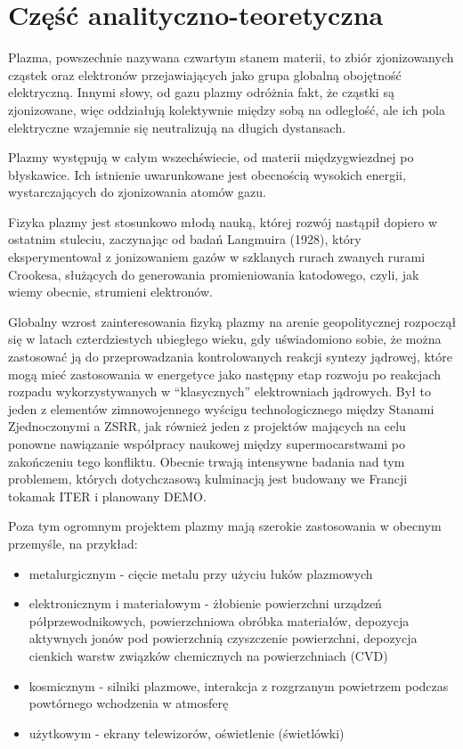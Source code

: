 \section[Część analityczno-teoretyczna]{Część analityczno-teoretyczna} %
    Plazma, powszechnie nazywana czwartym stanem materii, to zbiór
    zjonizowanych cząstek oraz elektronów przejawiających jako grupa globalną
    obojętność elektryczną. Innymi słowy, od gazu plazmy odróżnia fakt, że
    cząstki są zjonizowane, więc oddziałują kolektywnie między sobą na
    odległość, ale ich pola elektryczne wzajemnie się neutralizują na długich
    dystansach.

    Plazmy występują w całym wszechświecie, od materii międzygwiezdnej po
    błyskawice.  Ich istnienie uwarunkowane jest obecnością wysokich energii,
    wystarczających do zjonizowania atomów gazu.

    Fizyka plazmy jest stosunkowo młodą nauką, której rozwój nastąpił dopiero w
    ostatnim stuleciu, zaczynając od badań Langmuira (1928), który
    eksperymentował z jonizowaniem gazów w szklanych rurach zwanych rurami
    Crookesa, służących do generowania promieniowania katodowego, czyli, jak
    wiemy obecnie, strumieni elektronów.

    Globalny wzrost zainteresowania fizyką plazmy na arenie geopolitycznej
    rozpoczął się w latach czterdziestych ubiegłego wieku, gdy uświadomiono sobie,
    że można zastosować ją do przeprowadzania kontrolowanych reakcji syntezy
    jądrowej, 
    które mogą mieć zastosowania w energetyce jako następny etap rozwoju po
    reakcjach rozpadu wykorzystywanych w ``klasycznych'' elektrowniach jądrowych.
    Był to jeden z elementów zimnowojennego wyścigu technologicznego między Stanami
    Zjednoczonymi a ZSRR, jak również jeden z projektów mających na celu ponowne
    nawiązanie współpracy naukowej między supermocarstwami po zakończeniu tego
    konfliktu. Obecnie trwają intensywne badania nad tym problemem, których
    dotychczasową kulminacją jest budowany we Francji tokamak ITER i planowany
    DEMO.

    Poza tym ogromnym projektem plazmy mają szerokie zastosowania w obecnym
    przemyśle, na przykład:
    \begin{itemize}
        \item metalurgicznym - cięcie metalu przy użyciu łuków plazmowych
        \item elektronicznym i materiałowym - żłobienie powierzchni urządzeń
            półprzewodnikowych, powierzchniowa obróbka materiałów, depozycja
            aktywnych jonów pod powierzchnią czyszczenie powierzchni, depozycja
            cienkich warstw związków chemicznych na powierzchniach (CVD)
        \item kosmicznym - silniki plazmowe, interakcja z rozgrzanym powietrzem
            podczas powtórnego wchodzenia w atmosferę
        \item użytkowym - ekrany telewizorów, oświetlenie (świetlówki)
    \end{itemize}


